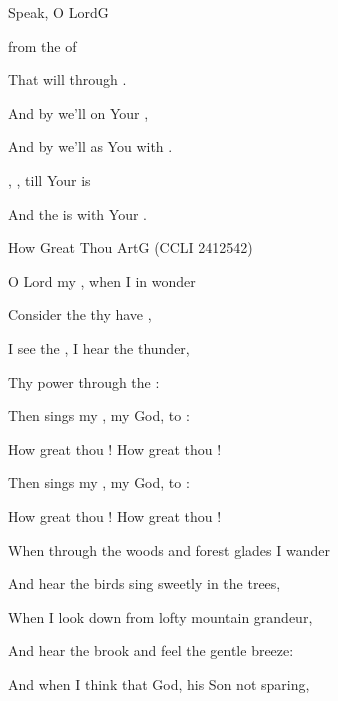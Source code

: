 \documentclass[12pt]{book}
\newcommand{\CCLInumber}{2412542}
\newcommand{\CCLIed}{{\CpyRtInfoFont (CCLI \CCLInumber)}}
\begin{document}
\begin{song}{Speak, O Lord}{G}
\begin{SBVerse}
  
    from the  of 

That will   
    through .

And by  we'll  
    on Your ,

And by  we'll  
    as You  with .

,  , 
    till Your  is 

And the  is  
    with Your .
\end{SBVerse}
\end{song}


\begin{song}{How Great Thou Art}{G}
    {}
    {}
    {}
    {\CCLIed}

\begin{SBVerse}
O Lord my , when I in  wonder

Consider  the  thy  have ,

I see the , I hear the  thunder,

Thy power through the  :
\end{SBVerse}

\begin{SBChorus}
Then sings my , my  God, to :

How great thou ! How great thou !

Then sings my , my  God, to :

How great thou ! How great thou !
\end{SBChorus}

\begin{SBVerse}
When through the woods and forest glades I wander

And hear the birds sing sweetly in the trees,

When I look down from lofty mountain grandeur,

And hear the brook and feel the gentle breeze:
\end{SBVerse}

\begin{SBVerse}
And when I think that God, his Son not sparing,


\end{SBVerse}
\end{song}
\end{document}
